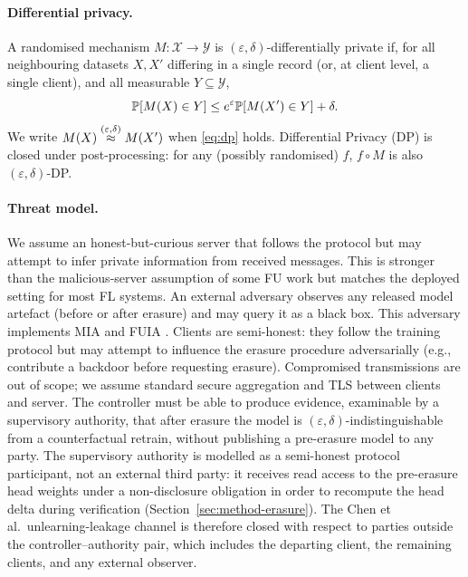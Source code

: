 \paragraph{Differential privacy.}
A randomised mechanism $M: \mathcal{X} \to \mathcal{Y}$ is $(\varepsilon,
\delta)$-differentially private if, for all neighbouring datasets $X, X'$ differing in a
single record (or, at client level, a single client), and all measurable $Y \subseteq
\mathcal{Y}$,
\begin{equation}
\mathbb{P}[M(X) \in Y] \leq e^{\varepsilon} \mathbb{P}[M(X') \in Y] + \delta.
\label{eq:dp}
\end{equation}
We write $M(X) \stackrel{(\varepsilon,\delta)}{\approx} M(X')$ when \eqref{eq:dp} holds. Differential Privacy (DP) is
closed under post-processing: for any (possibly randomised) $f$, $f \circ M$ is also
$(\varepsilon, \delta)$-DP.

\paragraph{Threat model.}
We assume an honest-but-curious server that follows the protocol but may attempt to
infer private information from received messages. This is stronger than the
malicious-server assumption of some FU work but matches the deployed setting for most FL
systems. An external adversary observes any released model artefact (before or after
erasure) and may query it as a black box. This adversary implements MIA
\cite{shokri2017mia,carlini2022lira} and FUIA \cite{fuia2025}. Clients are
semi-honest: they follow the training protocol but may attempt to influence the erasure
procedure adversarially (e.g., contribute a backdoor before requesting erasure).
Compromised transmissions are out of scope; we assume standard secure aggregation and
TLS between clients and server. The controller must be able to produce evidence,
examinable by a supervisory authority, that after erasure the model is $(\varepsilon,
\delta)$-indistinguishable from a counterfactual retrain, without publishing a
pre-erasure model to any party. The supervisory authority is modelled as a semi-honest
protocol participant, not an external third party: it receives read access to the
pre-erasure head weights under a non-disclosure obligation in order to recompute the
head delta during verification (Section~\ref{sec:method-erasure}). The Chen et al.\
unlearning-leakage channel \cite{chen2021unlearningleaks} is therefore closed with
respect to parties outside the controller–authority pair, which includes the
departing client, the remaining clients, and any external observer.

